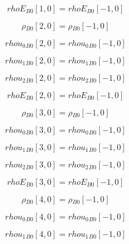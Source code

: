 \documentclass{article}
\begin{document}
\begin{dmath}{rhoE{_{B0}}}[{1,0}] = {rhoE{_{B0}}}[{-1,0}]\end{dmath}

\begin{dmath}{\rho{_{B0}}}[{2,0}] = {\rho{_{B0}}}[{-1,0}]\end{dmath}

\begin{dmath}{rhou_{0}{_{B0}}}[{2,0}] = {rhou_{0}{_{B0}}}[{-1,0}]\end{dmath}

\begin{dmath}{rhou_{1}{_{B0}}}[{2,0}] = {rhou_{1}{_{B0}}}[{-1,0}]\end{dmath}

\begin{dmath}{rhou_{2}{_{B0}}}[{2,0}] = {rhou_{2}{_{B0}}}[{-1,0}]\end{dmath}

\begin{dmath}{rhoE{_{B0}}}[{2,0}] = {rhoE{_{B0}}}[{-1,0}]\end{dmath}

\begin{dmath}{\rho{_{B0}}}[{3,0}] = {\rho{_{B0}}}[{-1,0}]\end{dmath}

\begin{dmath}{rhou_{0}{_{B0}}}[{3,0}] = {rhou_{0}{_{B0}}}[{-1,0}]\end{dmath}

\begin{dmath}{rhou_{1}{_{B0}}}[{3,0}] = {rhou_{1}{_{B0}}}[{-1,0}]\end{dmath}

\begin{dmath}{rhou_{2}{_{B0}}}[{3,0}] = {rhou_{2}{_{B0}}}[{-1,0}]\end{dmath}

\begin{dmath}{rhoE{_{B0}}}[{3,0}] = {rhoE{_{B0}}}[{-1,0}]\end{dmath}

\begin{dmath}{\rho{_{B0}}}[{4,0}] = {\rho{_{B0}}}[{-1,0}]\end{dmath}

\begin{dmath}{rhou_{0}{_{B0}}}[{4,0}] = {rhou_{0}{_{B0}}}[{-1,0}]\end{dmath}

\begin{dmath}{rhou_{1}{_{B0}}}[{4,0}] = {rhou_{1}{_{B0}}}[{-1,0}]\end{dmath}
\end{document}
